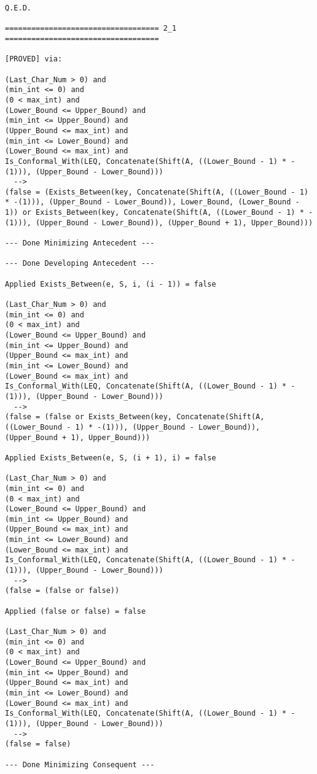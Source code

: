 \begin{lstlisting}[language=resolve]
Q.E.D.

=================================== 2_1 ===================================

[PROVED] via:

(Last_Char_Num > 0) and
(min_int <= 0) and
(0 < max_int) and
(Lower_Bound <= Upper_Bound) and
(min_int <= Upper_Bound) and
(Upper_Bound <= max_int) and
(min_int <= Lower_Bound) and
(Lower_Bound <= max_int) and
Is_Conformal_With(LEQ, Concatenate(Shift(A, ((Lower_Bound - 1) * -(1))), (Upper_Bound - Lower_Bound)))
  -->
(false = (Exists_Between(key, Concatenate(Shift(A, ((Lower_Bound - 1) * -(1))), (Upper_Bound - Lower_Bound)), Lower_Bound, (Lower_Bound - 1)) or Exists_Between(key, Concatenate(Shift(A, ((Lower_Bound - 1) * -(1))), (Upper_Bound - Lower_Bound)), (Upper_Bound + 1), Upper_Bound)))

--- Done Minimizing Antecedent ---

--- Done Developing Antecedent ---

Applied Exists_Between(e, S, i, (i - 1)) = false

(Last_Char_Num > 0) and
(min_int <= 0) and
(0 < max_int) and
(Lower_Bound <= Upper_Bound) and
(min_int <= Upper_Bound) and
(Upper_Bound <= max_int) and
(min_int <= Lower_Bound) and
(Lower_Bound <= max_int) and
Is_Conformal_With(LEQ, Concatenate(Shift(A, ((Lower_Bound - 1) * -(1))), (Upper_Bound - Lower_Bound)))
  -->
(false = (false or Exists_Between(key, Concatenate(Shift(A, ((Lower_Bound - 1) * -(1))), (Upper_Bound - Lower_Bound)), (Upper_Bound + 1), Upper_Bound)))

Applied Exists_Between(e, S, (i + 1), i) = false

(Last_Char_Num > 0) and
(min_int <= 0) and
(0 < max_int) and
(Lower_Bound <= Upper_Bound) and
(min_int <= Upper_Bound) and
(Upper_Bound <= max_int) and
(min_int <= Lower_Bound) and
(Lower_Bound <= max_int) and
Is_Conformal_With(LEQ, Concatenate(Shift(A, ((Lower_Bound - 1) * -(1))), (Upper_Bound - Lower_Bound)))
  -->
(false = (false or false))

Applied (false or false) = false

(Last_Char_Num > 0) and
(min_int <= 0) and
(0 < max_int) and
(Lower_Bound <= Upper_Bound) and
(min_int <= Upper_Bound) and
(Upper_Bound <= max_int) and
(min_int <= Lower_Bound) and
(Lower_Bound <= max_int) and
Is_Conformal_With(LEQ, Concatenate(Shift(A, ((Lower_Bound - 1) * -(1))), (Upper_Bound - Lower_Bound)))
  -->
(false = false)

--- Done Minimizing Consequent ---


\end{lstlisting}
